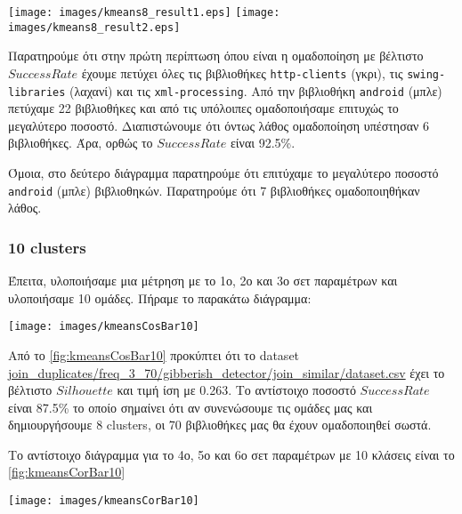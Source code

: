 \noindent\begin{minipage}{\linewidth}
    \centering
    \texttt{[image: images/kmeans8\_result1.eps]}
    \texttt{[image: images/kmeans8\_result2.eps]}
    \label{fig:kmeans8_result}
\end{minipage}

Παρατηρούμε ότι στην πρώτη περίπτωση όπου είναι η ομαδοποίηση με βέλτιστο $Success Rate$ έχουμε πετύχει όλες τις βιβλιοθήκες \texttt{http-clients} (γκρι), τις \texttt{swing-libraries} (λαχανί) και τις \texttt{xml-processing}. Από την βιβλιοθήκη \texttt{android} (μπλε) πετύχαμε 22 βιβλιοθήκες και από τις υπόλοιπες ομαδοποιήσαμε επιτυχώς το μεγαλύτερο ποσοστό.
Διαπιστώνουμε ότι όντως λάθος ομαδοποίηση υπέστησαν 6 βιβλιοθήκες.
Άρα, ορθώς το $Success Rate$ είναι 92.5\%.

Όμοια, στο δεύτερο διάγραμμα παρατηρούμε ότι επιτύχαμε το μεγαλύτερο ποσοστό \texttt{android} (μπλε) βιβλιοθηκών.
Παρατηρούμε ότι 7 βιβλιοθήκες ομαδοποιηθήκαν λάθος.

\subsubsection{10 clusters}
Έπειτα, υλοποιήσαμε μια μέτρηση με το 1ο, 2ο και 3ο σετ παραμέτρων και υλοποιήσαμε 10 ομάδες. Πήραμε το παρακάτω διάγραμμα:

\noindent\begin{minipage}{\linewidth}
    \centering
    \texttt{[image: images/kmeansCosBar10]}
    \label{fig:kmeansCosBar10}
\end{minipage}

Από το
\hyperref[fig:kmeansCosBar10]{\figurename{} \ref{fig:kmeansCosBar10}}
προκύπτει ότι το dataset \url{join_duplicates/freq_3_70/gibberish_detector/join_similar/dataset.csv} έχει το βέλτιστο $Silhouette$ και τιμή ίση με 0.263. Το αντίστοιχο ποσοστό $SuccessRate$ είναι 87.5\% το οποίο σημαίνει ότι αν συνενώσουμε τις ομάδες μας και δημιουργήσουμε 8 clusters, οι 70 βιβλιοθήκες μας θα έχουν ομαδοποιηθεί σωστά.

Το αντίστοιχο διάγραμμα για το 4ο, 5ο και 6ο σετ παραμέτρων με 10 κλάσεις είναι το
\hyperref[fig:kmeansCorBar10]{\figurename{} \ref{fig:kmeansCorBar10}}

\noindent\begin{minipage}{\linewidth}
    \centering
    \texttt{[image: images/kmeansCorBar10]}
    \label{fig:kmeansCorBar10}
\end{minipage}

